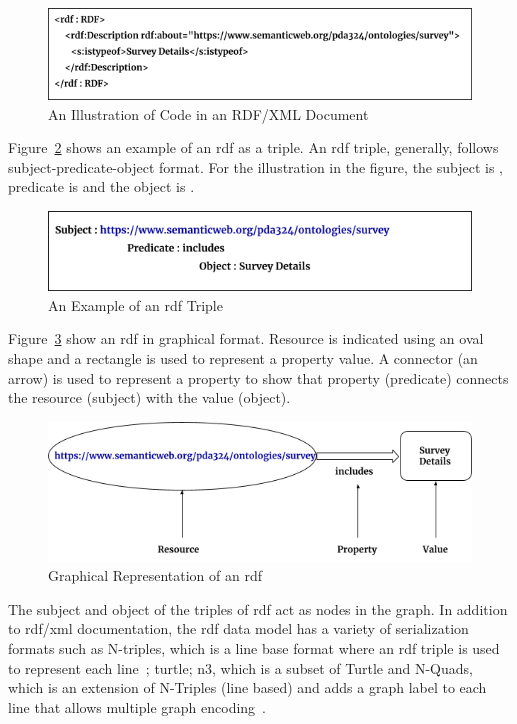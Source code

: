 \begin{doublespace}
\begin{figure}[htp]
    \centering
    \includegraphics[width=15cm]{images/ch2/Figure4.png}
    \caption{An Illustration of Code in an RDF/XML Document}
    \label{fig:2.4}
\end{figure}
\par Figure~\ref{fig:2.5} shows an example of an \ac{rdf} as a triple. An \ac{rdf} triple, generally, follows subject-predicate-object format. For the illustration in the figure, the subject is , predicate is  and the object is .
\begin{figure}[htp]
    \centering
    \includegraphics[width=15cm]{images/ch2/Figure5.png}
    \caption{An Example of an \ac{rdf} Triple}
    \label{fig:2.5}
\end{figure}
\par Figure~\ref{fig:2.6} show an \ac{rdf} in graphical format. Resource is indicated using an oval shape and a rectangle is used to represent a property value. A connector (an arrow) is used to represent a property to show that property (predicate) connects the resource (subject) with the value (object).
\begin{figure}[htp]
    \centering
    \includegraphics[width=15cm]{images/ch2/Figure6.png}
    \caption{Graphical Representation of an \ac{rdf}}
    \label{fig:2.6}
\end{figure}
\par The subject and object of the triples of \ac{rdf} act as nodes in the graph. In addition to \ac{rdf}/\ac{xml} documentation, the \ac{rdf} data model has a variety of serialization formats such as N-triples, which is a line base format where an \ac{rdf} triple is used to represent each line~\cite{beckett2014rdf}; \ac{turtle}; \ac{n3}, which is a subset of Turtle and N-Quads, which is an extension of N-Triples (line based) and adds a graph label to each line that allows multiple graph encoding~\cite{cyganiak2008n}.

\end{doublespace}
